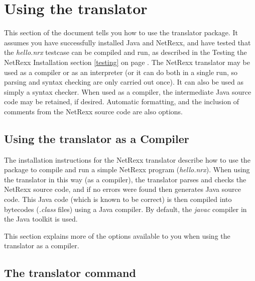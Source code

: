 

\chapter{Using the translator}
This section of the document tells you how to use the
translator package.  It assumes you have successfully installed Java and
NetRexx, and have tested that the \emph{hello.nrx} testcase can be
compiled and run, as described in the Testing the
NetRexx Installation section \ref{testing} on page \pageref{testing}.
\newline
The NetRexx translator may be used as a compiler or as an interpreter
(or it can do both in a single run, so parsing and syntax checking are
only carried out once).  It can also be used as simply a syntax checker.
\newline
When used as a compiler, the intermediate Java source code may be
retained, if desired.  Automatic formatting, and the inclusion of comments
from the NetRexx source code are also options.

\section{Using the translator as a Compiler}
The installation instructions for the NetRexx translator describe how to
use the package to compile and run a simple NetRexx program
(\emph{hello.nrx}).  When using the translator in this way (as a
compiler), the translator parses and checks the NetRexx source code, and
if no errors were found then generates Java source code.  This Java code
(which is known to be correct) is then compiled into bytecodes
(\emph{.class} files) using a Java compiler.  By default,
the \emph{javac} compiler in the Java toolkit is used.

This section explains more of the options available to you when using
the translator as a compiler.
\section{The translator command}

